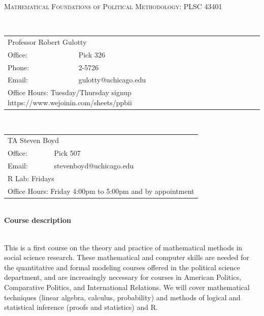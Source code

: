 \documentclass[11pt]{article}
\begin{document}
\begin{center}

\large
\textsc{Mathematical Foundations of Political Methodology: PLSC 43401}\\
\end{center}

\small

\ \\ \begin{tabular} {ll} \multicolumn{2}{l}{Professor Robert Gulotty}\\
Office: &Pick 326\\
Phone: &2-5726\\
Email: &gulotty@uchicago.edu\\
\multicolumn{2}{l}{Office Hours: Tuesday/Thursday signup https://www.wejoinin.com/sheets/ppbii}
\end{tabular}

\vspace{.15in}
\vspace{.15in}

\ \\ \begin{tabular} {ll} \multicolumn{2}{l}{TA Steven Boyd}\\
Office: & Pick 507 \\
Email: &stevenboyd@uchicago.edu  \\
\multicolumn{2}{l}{R Lab: Fridays}\\
\multicolumn{2}{l}{Office Hours: Friday 4:00pm to 5:00pm and by appointment}
\end{tabular}

\vspace{.5in}

\ \\{\bf Course description}  

\ \\This is a first course on the theory and practice of mathematical methods in social science research.  These mathematical and computer skills are needed for the quantitative and formal modeling courses offered in the political science department, and are increasingly necessary for courses in American Politics, Comparative Politics, and International Relations.   We will cover mathematical techniques (linear algebra, calculus, probability) and methods of logical and statistical inference (proofs and statistics) and R.

\vspace{.1in}
\end{document}
